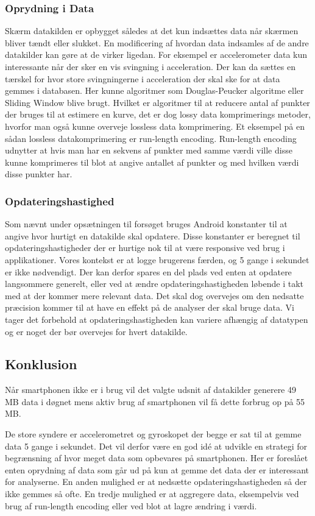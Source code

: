 \subsubsection{Oprydning i Data}\label{sec:opryd}
Skærm datakilden er opbygget således at det kun indsættes data når skærmen bliver tændt eller slukket.
En modificering af hvordan data indsamles af de andre datakilder kan gøre at de virker ligedan. 
For eksempel er accelerometer data kun interessante når der sker en vis svingning i acceleration.
Der kan da sættes en tærskel for hvor store svingningerne i acceleration der skal ske for at data gemmes i databasen.
Her kunne algoritmer som Douglas-Peucker algoritme eller Sliding Window blive brugt.
Hvilket er algoritmer til at reducere antal af punkter der bruges til at estimere en kurve, det er dog lossy data komprimerings metoder, hvorfor man også kunne overveje lossless data komprimering.
Et eksempel på en sådan lossless datakomprimering er run-length encoding.
Run-length encoding udnytter at hvis man har en sekvens af punkter med samme værdi ville disse kunne komprimeres til blot at angive antallet af punkter og med hvilken værdi disse punkter har.

\subsubsection{Opdateringshastighed}
Som nævnt under opsætningen til forsøget bruges Android konstanter til at angive hvor hurtigt en datakilde skal opdatere.
Disse konstanter er beregnet til opdateringshastigheder der er hurtige nok til at være responsive ved brug i applikationer.
Vores kontekst er at logge brugerens færden, og 5 gange i sekundet er ikke nødvendigt.
Der kan derfor spares en del plads ved enten at opdatere langsommere generelt, eller ved at ændre opdateringshastigheden løbende i takt med at der kommer mere relevant data.
Det skal dog overvejes om den nedsatte præcision kommer til at have en effekt på de analyser der skal bruge data.
Vi tager det forbehold at opdateringshastigheden kan variere afhængig af datatypen og er noget der bør overvejes for hvert datakilde.

\subsection{Konklusion}
Når smartphonen ikke er i brug vil det valgte udsnit af datakilder generere 49 MB data i døgnet mens aktiv brug af smartphonen vil få dette forbrug op på 55 MB.

De store syndere er accelerometret og gyroskopet der begge er sat til at gemme data 5 gange i sekundet.
Det vil derfor være en god idé at udvikle en strategi for begrænsning af hvor meget data som opbevares på smartphonen.
Her er foreslået enten oprydning af data som går ud på kun at gemme det data der er interessant for analyserne.
En anden mulighed er at nedsætte opdateringshastigheden så der ikke gemmes så ofte.
En tredje mulighed er at aggregere data, eksempelvis ved brug af run-length encoding eller ved blot at lagre ændring i værdi.

